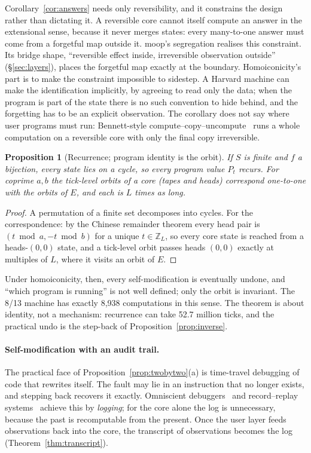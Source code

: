\documentclass[11pt]{article}
\newtheorem{proposition}[theorem]{Proposition}
\theoremstyle{definition}
\theoremstyle{remark}
\newcommand{\moop}{\textsf{moop}}
\begin{document}
Corollary~\ref{cor:answers} needs only reversibility, and it constrains
the design rather than dictating it. A reversible core cannot itself
compute an answer in the extensional sense, because it never merges
states: every many-to-one answer must come from a forgetful map outside
it. \moop{}'s segregation realises this constraint. Its bridge shape,
``reversible effect inside, irreversible observation outside''
(\S\ref{sec:layers}), places the forgetful map exactly at the boundary.
Homoiconicity's part is to make the constraint impossible to sidestep. A
Harvard machine can make the identification implicitly, by agreeing to
read only the data; when the program is part of the state there is no
such convention to hide behind, and the forgetting has to be an explicit
observation. The corollary does not say where user programs must run:
Bennett-style compute--copy--uncompute~\cite{bennett1973} runs a whole
computation on a reversible core with only the final copy irreversible.

\begin{proposition}[Recurrence; program identity is the orbit]
\label{prop:recurrence}
If $S$ is finite and $f$ a bijection, every state lies on a cycle, so
every program value $P_t$ recurs. For coprime $a,b$ the tick-level orbits
of a core (tapes and heads) correspond one-to-one with the orbits of $E$,
and each is $L$ times as long.
\end{proposition}
\begin{proof}
A permutation of a finite set decomposes into cycles. For the
correspondence: by the Chinese remainder theorem every head pair is
$(t\bmod a,-t\bmod b)$ for a unique $t\in\mathbb{Z}_L$, so every core
state is reached from a heads-$(0,0)$ state, and a tick-level orbit
passes heads $(0,0)$ exactly at multiples of $L$, where it visits an
orbit of $E$.
\end{proof}

Under homoiconicity, then, every self-modification is eventually undone,
and ``which program is running'' is not well defined; only the orbit is
invariant. The 8/13 machine has exactly 8,938 computations in this sense.
The theorem is about identity, not a mechanism: recurrence can take 52.7
million ticks, and the practical undo is the step-back of
Proposition~\ref{prop:inverse}.

\paragraph{Self-modification with an audit trail.}
The practical face of Proposition~\ref{prop:twobytwo}(a) is time-travel
debugging of code that rewrites itself. The fault may lie in an
instruction that no longer exists, and stepping back recovers it
exactly. Omniscient debuggers~\cite{lewis2003} and record--replay
systems~\cite{ocallahan2017} achieve this by \emph{logging}; for the core
alone the log is unnecessary, because the past is recomputable from the
present. Once the user layer feeds observations back into the core, the
transcript of observations becomes the log
(Theorem~\ref{thm:transcript}).
\end{document}
